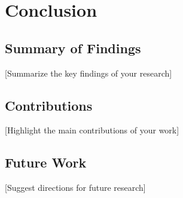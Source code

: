 \chapter{Conclusion}

\section{Summary of Findings}
[Summarize the key findings of your research]

\section{Contributions}
[Highlight the main contributions of your work]

\section{Future Work}
[Suggest directions for future research] 